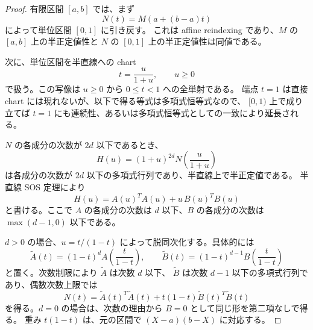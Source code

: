 \documentclass[uplatex,dvipdfmx]{jsarticle}
\theoremstyle{matrixsosdefinition}
\begin{document}
\begin{proof}
有限区間 \([a,b]\) では、まず
\[
  N(t)=M(a+(b-a)t)
\]
によって単位区間 \([0,1]\) に引き戻す。
これは affine reindexing であり、\(M\) の \([a,b]\) 上の半正定値性と
\(N\) の \([0,1]\) 上の半正定値性は同値である。

  次に、単位区間を半直線への chart
  \[
    t=\frac{u}{1+u},\qquad u\ge0
  \]
で扱う。この写像は \(u\ge0\) から \(0\le t<1\) への全単射である。
端点 \(t=1\) は直接 chart には現れないが、以下で得る等式は多項式恒等式なので、
\([0,1)\) 上で成り立てば \(t=1\) にも連続性、あるいは多項式恒等式としての一致により延長される。

\(N\) の各成分の次数が \(2d\) 以下であるとき、
\[
  H(u)=(1+u)^{2d}N\!\left(\frac{u}{1+u}\right)
\]
は各成分の次数が \(2d\) 以下の多項式行列であり、半直線上で半正定値である。
半直線 SOS 定理により
  \[
    H(u)=A(u)^T A(u)+u\,B(u)^T B(u)
  \]
  と書ける。ここで \(A\) の各成分の次数は \(d\) 以下、\(B\) の各成分の次数は
  \(\max(d-1,0)\) 以下である。

  \(d>0\) の場合、\(u=t/(1-t)\) によって脱同次化する。具体的には
  \[
    \widetilde A(t)=(1-t)^d A\!\left(\frac{t}{1-t}\right),\qquad
    \widetilde B(t)=(1-t)^{d-1} B\!\left(\frac{t}{1-t}\right)
  \]
  と置く。次数制限により \(\widetilde A\) は次数 \(d\) 以下、
  \(\widetilde B\) は次数 \(d-1\) 以下の多項式行列であり、偶数次数上限では
    \[
      N(t)=\widetilde A(t)^T\widetilde A(t)
        +t(1-t)\widetilde B(t)^T\widetilde B(t)
    \]
    を得る。\(d=0\) の場合は、次数の理由から \(B=0\) として同じ形を第二項なしで得る。
  重み \(t(1-t)\) は、元の区間で \((X-a)(b-X)\) に対応する。


\end{proof}
\end{document}
